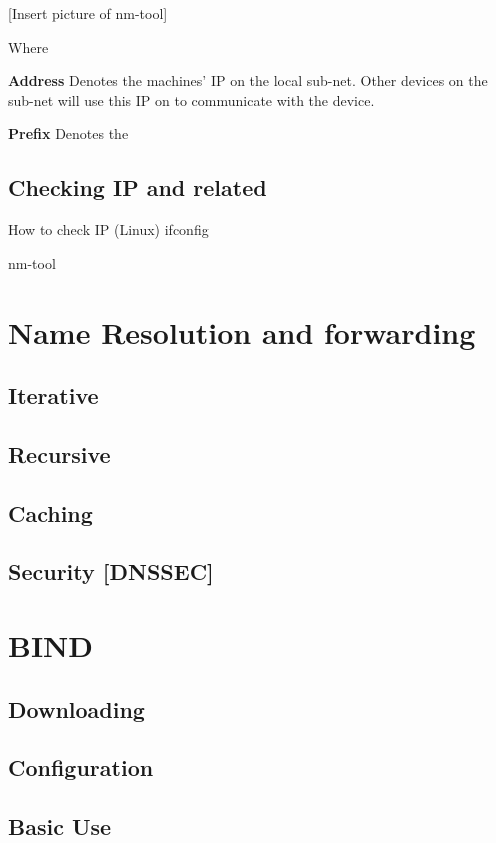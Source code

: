 [Insert picture of nm-tool]

Where 

\textbf{Address} 
Denotes the machines' IP on the local sub-net. Other devices on the sub-net will use this IP on to communicate with the device.

\textbf{Prefix} 
Denotes the 

\subsection{Checking IP and related}
How to check IP (Linux) ifconfig

nm-tool

\section{Name Resolution and forwarding}
\subsection{Iterative}
\subsection{Recursive}
\subsection{Caching}
\subsection{Security [DNSSEC]}
\section{BIND}
\subsection{Downloading}
\subsection{Configuration}
\subsection{Basic Use}

